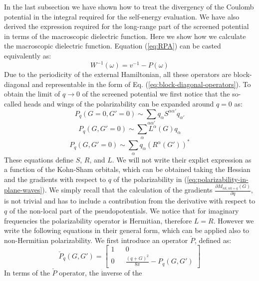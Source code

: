 \documentclass[11pt]{article}
\begin{document}
In the last subsection we have shown how to treat the divergency of
the Coulomb potential in the integral required for the
self-energy evaluation. We have also derived the expression required
for the long-range part of the screened potential in
terms of the macroscopic dielectric function.
Here we show how we calculate the macroscopic dielectric function.
Equation (\ref{eq:RPA}) can be casted equivalently as:
\begin{equation}
W^{-1}(\omega) = v^{-1} - P(\omega)
\end{equation}
Due to the periodicity of the external Hamiltonian,
all these operators are block-diagonal and representable in the
form of Eq. (\ref{eq:block-diagonal-operators}).
To obtain the limit of $q\rightarrow 0$ of the screened potential
we first notice that the so-called heads and wings \cite{rohl-loui00prb} 
of the polarizability can be expanded around $q=0$ as:
\begin{equation}
P_q(G=0,G'=0) \sim \sum_{\alpha\alpha'} q_{\alpha} S^{\alpha\alpha'} q_{\alpha'}
\end{equation}
\begin{equation}
P_q(G,G'=0) \sim \sum_{\alpha} L^{\alpha}(G) q_{\alpha}
\end{equation}
\begin{equation}
P_q(G,G'=0) \sim \sum_{\alpha} q_{\alpha} (R^{\alpha}(G'))^*
\end{equation}
These equations define $S$, $R$, and $L$. We will not write
their explict expression as a function of the Kohn-Sham
orbitals, which can be obtained taking the Hessian and the
gradients with respect to $q$ of the polarizability in (\ref{eq:polarizability-in-plane-waves}).
We simply recall that the calculation of the gradients
$\frac{\partial M_{nk,nk+q}(G)}{\partial q}$, is not
trivial and has to include a contribution from the derivative with
respect to $q$ of the non-local part of the pseudopotentials.
We notice that for imaginary frequencies the polarizability operator is Hermitian,
therefore $L=R$.
However we write the following equations in their general
form, which can be applied also to non-Hermitian polarizability.
We first introduce an operator $\check{P}$, defined as:
\begin{equation}
\check{P}_q(G,G') = \begin{bmatrix}
1 && 0 \\
0 && \frac{(q+G)^2}{8\pi} - P_q(G,G')
\end{bmatrix}
\end{equation}
In terms of the $\check{P}$ operator, the inverse of the 
\end{document}
